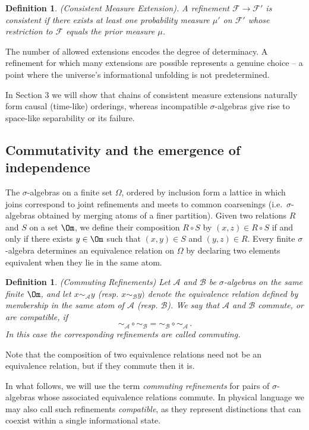 \documentclass[
 amsmath,amssymb,
  onecolumn %
]{revtex4-2}
\newtheorem{definition}[theorem]{Definition}
\newcommand{\Ff}{{\mathcal F}}  %
\newcommand{\Aa}{{\mathcal A}}  %
\newcommand{\Bb}{{\mathcal B}}
\begin{document}
\begin{definition} (Consistent Measure Extension). 
A refinement $\Ff \longrightarrow \Ff'$ is \emph{consistent} if there exists at least one probability measure $\mu'$ on $\Ff'$ whose restriction to $\Ff$ equals the prior measure $\mu$. 
\end{definition}  

The number of allowed extensions encodes the degree of determinacy. A refinement for which many extensions are possible represents a genuine choice -- a point where the universe’s informational unfolding is not predetermined.

In Section 3 we will show that chains of consistent measure extensions naturally form causal (time-like) orderings, whereas incompatible $\sigma$-algebras give rise to space-like separability or its failure.

\subsection{Commutativity and the emergence of independence} 
The $\sigma$-algebras on a finite set $\Omega$, ordered by inclusion
form a lattice in which joins correspond to joint refinements and
meets to common coarsenings (i.e.\ $\sigma$-algebras obtained by
merging atoms of a finer partition). Given two relations $R$ and $S$ on a set $\Om$, we define their composition $R\circ S$ by $(x,z) \in R \circ S$ if and only if there exists $y \in \Om$ such that $(x,y)\in S$ and $(y,z) \in R$.  Every finite $\sigma$-algebra determines an equivalence relation on $\Omega$ by declaring two elements equivalent when they lie in the same atom.

\begin{definition}(Commuting Refinements) \label{CR} 
Let $\Aa$ and $\Bb$ be $\sigma$-algebras on the same finite $\Om$, and let $x \sim_{\Aa} y$ (resp. $x\sim_{\Bb} y)$ denote the equivalence relation defined by membership in the same atom of $\Aa$ (resp. $\Bb$).  We say that $\Aa$ and $\Bb$ \emph{commute}, or are \emph{compatible}, if 
$$
\sim_{\Aa} \circ \sim_{\Bb} = \sim_{\Bb} \circ \sim_{\Aa}\,.
$$
In this case the corresponding refinements are called \emph{commuting}. 
\end{definition}

\noindent Note that the composition of two equivalence relations need not be an equivalence relation, but if they commute then it is. 

In what follows, we will use the term \emph{commuting refinements} for pairs of $\sigma$-algebras whose associated equivalence relations commute. In physical language we may also call such refinements \emph{compatible}, as they represent distinctions that can coexist within a single informational state.
\end{document}
